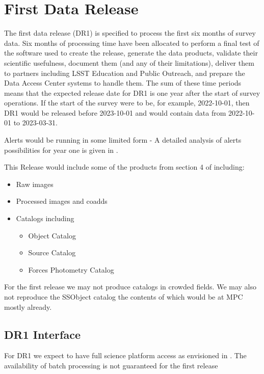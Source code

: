 \section{First Data Release } \label{sect:dr1}

The first data release (DR1) is specified to process the first six months of survey data.
Six months of processing time have been allocated to perform a final test of the software used to create the release, generate the data products, validate their scientific usefulness, document them (and any of their limitations), deliver them to partners including LSST Education and Public Outreach, and prepare the Data Access Center systems to handle them.
The sum of these time periods means that the expected release date for DR1 is one year after the start of survey operations.
If the start of the survey were to be, for example, 2022-10-01, then DR1 would be released before 2023-10-01 and would contain data from 2022-10-01 to 2023-03-31.

Alerts would be running in some limited form - A detailed analysis of alerts possibilities for year one is given in .


This Release would include some of the products from section 4 of \DPDD including:

\begin{itemize}
\item  Raw images
\item  Processed images and coadds
\item  Catalogs including

\begin{itemize}
\item Object Catalog
\item Source Catalog
\item Forces Photometry Catalog
\end{itemize}

\end{itemize}

For the first release we may not produce catalogs in crowded fields.
We may also not reproduce the SSObject catalog the  contents of which would be at MPC mostly already.

\subsection {DR1 Interface}
For DR1 we expect to have full science platform access as envisioned in .
The availability of batch processing is not guaranteed for the first release
